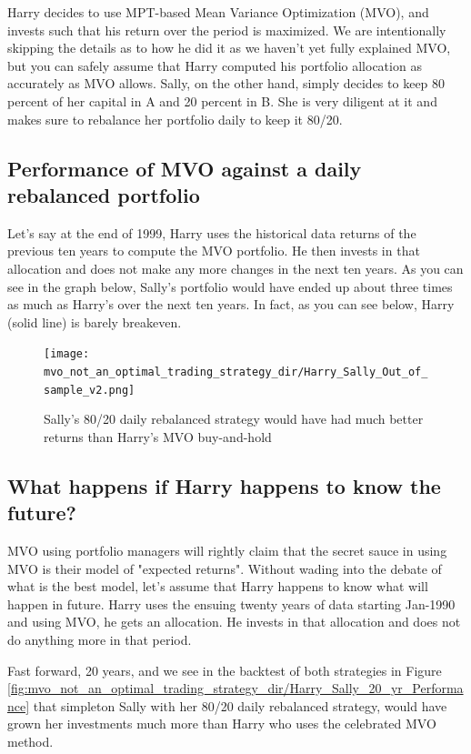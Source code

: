 \documentclass[a4paper]{article}
\begin{document}
Harry decides to use MPT-based Mean Variance Optimization (MVO), and invests such that his return over the period is maximized. We are intentionally skipping the details as to how he did it as we haven’t yet fully explained MVO, but you can safely assume that Harry computed his portfolio allocation as accurately as MVO allows. Sally, on the other hand, simply decides to keep 80 percent of her capital in A and 20 percent in B. She is very diligent at it and makes sure to rebalance her portfolio daily to keep it 80/20.

\subsection{ Performance of MVO against a daily rebalanced portfolio\label{80-20-does-better-than-MVO-buy-and-hold} }
Let's say at the end of 1999, Harry uses the historical data returns of the previous ten years to compute the MVO portfolio. He then invests in that allocation and does not make any more changes in the next ten years. As you can see in the graph below, Sally's portfolio would have ended up about three times as much as Harry's over the next ten years. In fact, as you can see below, Harry (solid line) is barely breakeven.
\begin{figure}[h!]
	\centering
	\texttt{[image: mvo\_not\_an\_optimal\_trading\_strategy\_dir/Harry\_Sally\_Out\_of\_sample\_v2.png]}
	\caption{\label{fig:Harry_Sally_Out_Of_Sample}Sally's 80/20 daily rebalanced strategy would have had much better returns than Harry's MVO buy-and-hold}
\end{figure}

\subsection{ What happens if Harry happens to know the future? }
MVO using portfolio managers will rightly claim that the secret sauce in using MVO is their model of "expected returns". Without wading into the debate of what is the best model, let's assume that Harry happens to know what will happen in future. Harry uses the ensuing twenty years of data starting Jan-1990 and using MVO, he gets an allocation. He invests in that allocation and does not do anything more in that period.

Fast forward, 20 years, and we see in the backtest of both strategies in Figure \ref{fig:mvo_not_an_optimal_trading_strategy_dir/Harry_Sally_20_yr_Performance} that simpleton Sally with her 80/20 daily rebalanced strategy, would have grown her investments much more than Harry who uses the celebrated MVO method.
\end{document}

